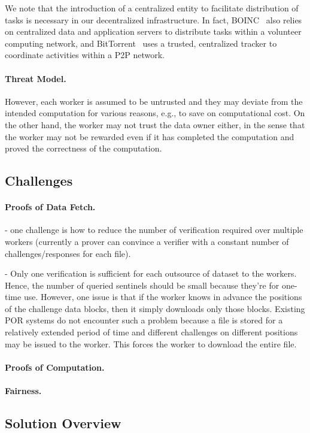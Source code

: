 We note that the introduction of a centralized entity to facilitate distribution of tasks is necessary in our decentralized infrastructure.
In fact, BOINC~\cite{And04} also relies on centralized data and application servers to distribute tasks within a volunteer computing network, and BitTorrent~\cite{Coh03} uses a trusted, centralized tracker to coordinate activities within a P2P network.

\paragraph{Threat Model.}
However, each worker is assumed to be untrusted and they may deviate from the intended computation for various reasons, e.g., to save on computational cost. 
On the other hand, the worker may not trust the data owner either, in the sense that the worker may not be rewarded even if it has completed the computation and proved the correctness of the computation.


\subsection{Challenges} \label{sect:challenges}

\paragraph{Proofs of Data Fetch.}
- one challenge is how to reduce the number of verification required over multiple workers (currently a prover can convince a verifier with a constant number of challenges/responses for each file). 

- Only one verification is sufficient for each outsource of dataset to the workers. Hence, the number of queried sentinels should be small because they're for one-time use. However, one issue is that if the worker knows in advance the positions of the challenge data blocks, then it simply downloads only those blocks. Existing POR systems do not encounter such a problem because a file is stored for a relatively extended period of time and different challenges on different positions may be issued to the worker. This forces the worker to download the entire file.

\paragraph{Proofs of Computation.}


\paragraph{Fairness.}



\subsection{Solution Overview} \label{sect:solution}

